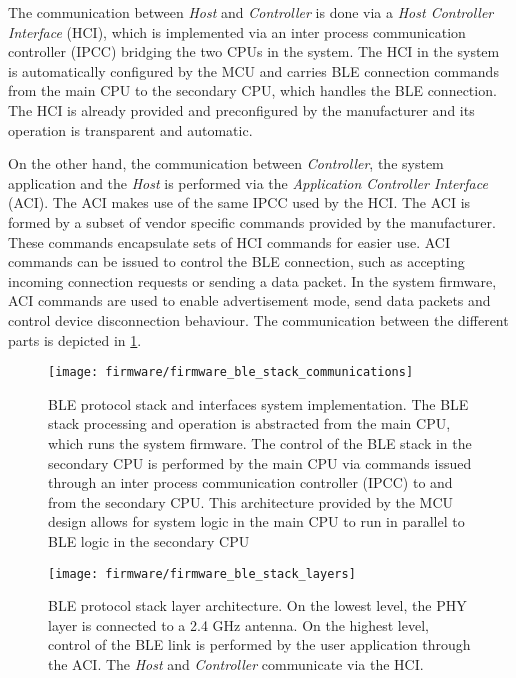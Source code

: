 The communication between \textit{Host} and \textit{Controller} is done via a \textit{Host Controller Interface} (HCI), which is implemented via an inter process communication controller (IPCC) bridging the two CPUs in the system. The HCI in the system is automatically configured by the MCU and carries BLE connection commands from the main CPU to the secondary CPU, which handles the BLE connection. The HCI is already provided and preconfigured by the manufacturer and its operation is transparent and automatic.

On the other hand, the communication between \textit{Controller}, the system application and the \textit{Host} is performed via the \textit{Application Controller Interface} (ACI). The ACI makes use of the same IPCC used by the HCI. The ACI is formed by a subset of vendor specific commands provided by the manufacturer. These commands encapsulate sets of HCI commands for easier use. ACI commands can be issued to control the BLE connection, such as accepting incoming connection requests or sending a data packet. In the system firmware, ACI commands are used to enable advertisement mode, send data packets and control device disconnection behaviour. The communication between the different parts is depicted in \cref{fig:firmware_ble_stack_communications}.


\begin{figure}[ht]
	\centering
	\texttt{[image: firmware/firmware\_ble\_stack\_communications]}
	\caption{BLE protocol stack and interfaces system implementation. The BLE stack processing and operation is abstracted from the main CPU, which runs the system firmware. The control of the BLE stack in the secondary CPU is performed by the main CPU via commands issued through an inter process communication controller (IPCC) to and from the secondary CPU. This architecture provided by the MCU design allows for system logic in the main CPU to run in parallel to BLE logic in the secondary CPU}
	\label{fig:firmware_ble_stack_communications}
\end{figure}

\begin{figure}[ht]
	\centering
	\texttt{[image: firmware/firmware\_ble\_stack\_layers]}
	\caption{BLE protocol stack layer architecture. On the lowest level, the PHY layer is connected to a 2.4 GHz antenna. On the highest level, control of the BLE link is performed by the user application through the ACI. The \textit{Host} and \textit{Controller} communicate via the HCI.}
	\label{fig:firmware_ble_stack_layers}
\end{figure}

